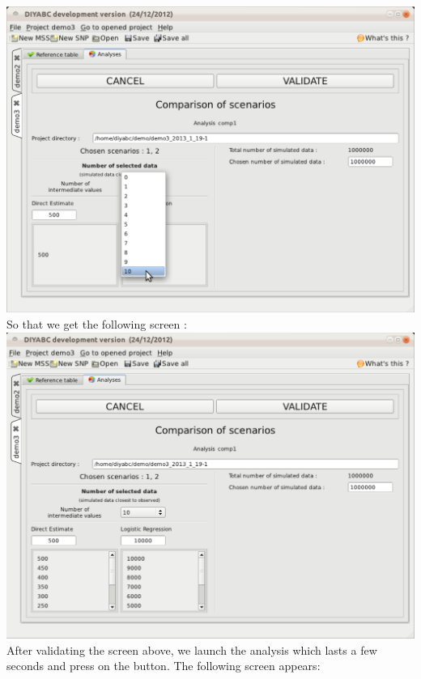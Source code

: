 \includegraphics[scale=0.3]{gui_pictures/Capture-DIYABC-109} \\


So that we get the following screen :\\


\includegraphics[scale=0.3]{gui_pictures/Capture-DIYABC-110} \\


After validating the screen above, we launch the analysis which lasts
a few seconds and press on the  button.
The following screen appears:\\


